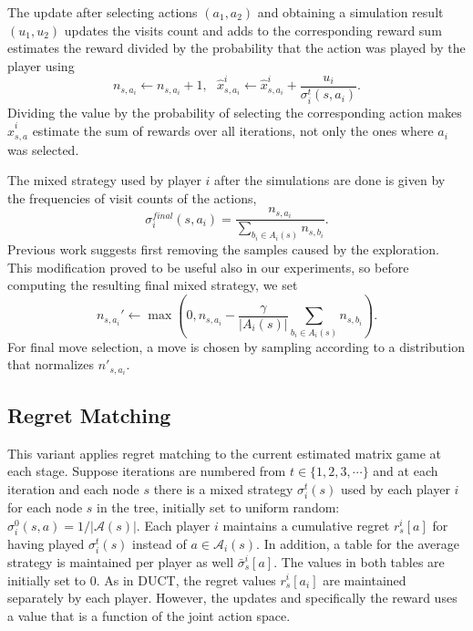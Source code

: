 \documentclass[conference]{IEEEtran}
\newcommand{\cA}{\mathcal{A}}
\begin{document}
The update after selecting actions $(a_1,a_2)$ and obtaining a simulation result $(u_1,u_2)$ updates the visits count 
and adds to the corresponding reward sum estimates the reward divided by the probability that the action was played by the player using
\[n_{s,a_i} \leftarrow n_{s,a_i} + 1, ~~~ \hat{x}^i_{s,a_i} \leftarrow \hat{x}^i_{s,a_i} + \frac{u_i}{\sigma^t_i(s,a_i)}.\]
Dividing the value by the probability of selecting the corresponding action makes $\hat{x}^i_{s,a}$ estimate the sum of rewards over all 
iterations, not only the ones where $a_i$ was selected. 

The mixed strategy used by player $i$ after the simulations are done is given by the frequencies of visit counts of the actions, 
\[\sigma^{final}_i(s,a_i) = \frac{n_{s,a_i}}{\sum_{b_i\in A_i(s)} n_{s,b_i}}.\]
Previous work \cite{Teytaud11Upper} suggests first removing the samples caused by the exploration. This modification proved to be useful also in our experiments, so before computing the resulting final mixed strategy, we set
\begin{equation}
n_{s,a_i}' \leftarrow \max\left(0,n_{s,a_i} - \frac{\gamma}{|A_i(s)|}\sum_{b_i\in A_i(s)}n_{s,b_i}\right).
\end{equation}
For final move selection, a move is chosen by sampling according to a distribution that normalizes $n'_{s,a_i}$. 

\subsection{Regret Matching}

This variant applies regret matching \cite{Hart00} to the current estimated matrix game at each stage. 
Suppose iterations are numbered from $t \in \{ 1, 2, 3, \cdots \}$ and at each iteration and each node $s$ 
there is a mixed strategy $\sigma_i^t(s)$ used by each player $i$ for each node $s$ in the tree, initially set to 
uniform random: $\sigma^0_i(s,a) = 1 / |\cA(s)|$. 
Each player $i$ maintains a cumulative regret $r^i_s[a]$ for having played $\sigma_i^t(s)$ instead of $a \in \cA_i(s)$. 
In addition, a table for the average strategy is maintained per player as well $\bar{\sigma}^i_s[a]$. The values in 
both tables are initially set to 0. 
As in DUCT, the regret values $r^i_s[a_i]$ are maintained separately by each player.
However, the updates and specifically the reward uses a value that is a function of the joint action space. 
\end{document}
